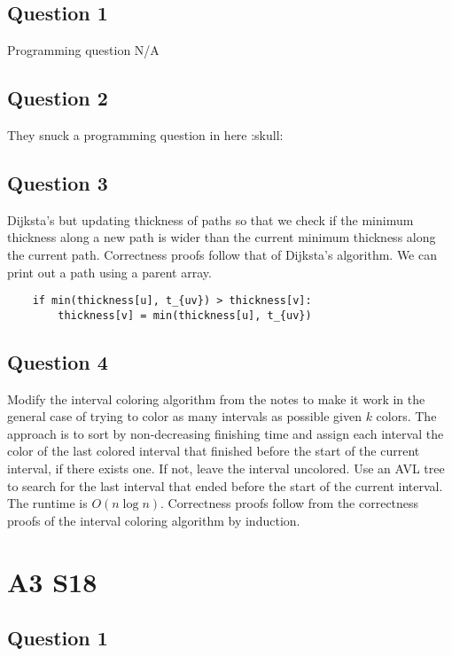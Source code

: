 \documentclass[11pt]{article}
\begin{document}
\subsection{Question 1}

Programming question N/A

\subsection{Question 2}

They snuck a programming question in here :skull:

\subsection{Question 3}

Dijksta's but updating thickness of paths so that we check if the minimum thickness along a new path is wider than the current minimum thickness along the current path. Correctness proofs follow that of Dijksta's algorithm. We can print out a path using a parent array.

\begin{verbatim}
    if min(thickness[u], t_{uv}) > thickness[v]:
        thickness[v] = min(thickness[u], t_{uv})
\end{verbatim}

\subsection{Question 4}

Modify the interval coloring algorithm from the notes to make it work in the general case of trying to color as many intervals as possible given $k$ colors. The approach is to sort by non-decreasing finishing time and assign each interval the color of the last colored interval that finished before the start of the current interval, if there exists one. If not, leave the interval uncolored. Use an AVL tree to search for the last interval that ended before the start of the current interval. The runtime is $O(n \log n)$. Correctness proofs follow from the correctness proofs of the interval coloring algorithm by induction.

\section{A3 S18}

\subsection{Question 1}
\end{document}
